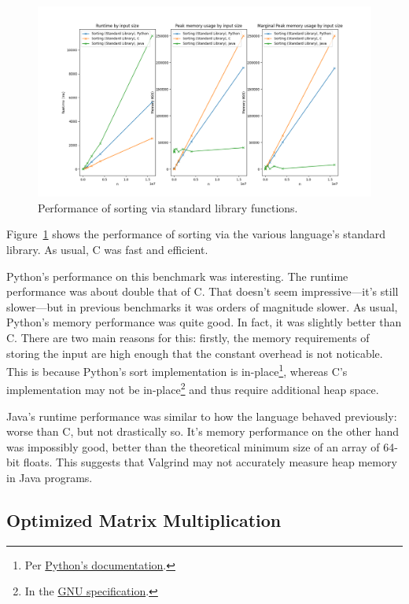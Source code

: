 \documentclass[12pt,letterpaper]{article}
\begin{document}
\begin{figure}[H]
  \centering
  \includegraphics[width=\textwidth]{./sort_stdlib-plot.png}
  \caption{Performance of sorting via standard library functions.}
  \label{plot-sort}
\end{figure}

Figure~\ref{plot-sort} shows the performance of sorting via the various
language's standard library.  As usual, C was fast and efficient.

Python's performance on this benchmark was interesting. The runtime performance
was about double that of C. That doesn't seem impressive—it's still slower—but
in previous benchmarks it was orders of magnitude slower. As usual, Python's
memory performance was quite good. In fact, it was slightly better than C.
There are two main reasons for this: firstly, the memory requirements of
storing the input are high enough that the constant overhead is not noticable.
This is because Python's sort implementation is in-place\footnote{Per
\href{https://docs.python.org/3/library/stdtypes.html#list.sort}{Python's
documentation}.}, whereas C's implementation may not be in-place\footnote{In
the
\href{https://www.gnu.org/software/libc/manual/html_node/Array-Sort-Function.html}{GNU
specification}.} and thus require additional heap space.

Java's runtime performance was similar to how the language behaved previously:
worse than C, but not drastically so. It's memory performance on the other hand
was impossibly good, better than the theoretical minimum size of an array of
64-bit floats. This suggests that Valgrind may not accurately measure heap
memory in Java programs.

\subsection{Optimized Matrix Multiplication}\label{matmul-opt}
\end{document}
